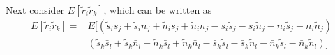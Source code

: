 Next consider $E[\tilde{r}_i\tilde{r}_k]$, which can be written as
\begin{equation}
  \begin{split}
    E[\tilde{r}_i\tilde{r}_k] = &E[(\tilde{s}_i\bar{s}_j + \tilde{s}_i\bar{n}_j + \tilde{n}_i\bar{s}_j + \tilde{n}_i\bar{n}_j - \bar{s}_i\tilde{s}_j - \bar{s}_i\tilde{n}_j - \bar{n}_i\tilde{s}_j - \bar{n}_i\tilde{n}_j)\\
    &(\tilde{s}_k\bar{s}_l + \tilde{s}_k\bar{n}_l + \tilde{n}_k\bar{s}_l + \tilde{n}_k\bar{n}_l - \bar{s}_k\tilde{s}_l - \bar{s}_k\tilde{n}_l - \bar{n}_k\tilde{s}_l - \bar{n}_k\tilde{n}_l)]

\end{split}
\end{equation}
